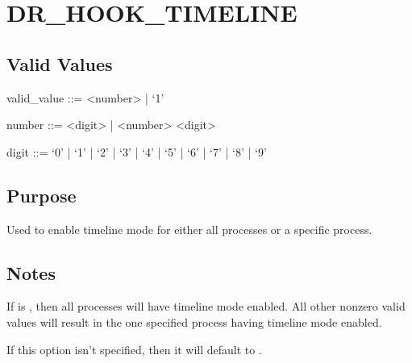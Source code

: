 \documentclass[letterpaper,10pt,english]{sphinxmanual}
\begin{document}
\section{DR\_HOOK\_TIMELINE}
\label{\detokenize{flag/flag:dr-hook-timeline}}\label{\detokenize{flag/flag:id90}}

\subsection{Valid Values}
\label{\detokenize{flag/flag:id91}}
\begin{DUlineblock}{0em}
\item[] valid\_value ::= \textless{}number\textgreater{} | ‘\sphinxhyphen{}1’
\item[] number ::= \textless{}digit\textgreater{} | \textless{}number\textgreater{} \textless{}digit\textgreater{}
\item[] digit ::= ‘0’ | ‘1’ | ‘2’ | ‘3’ | ‘4’ | ‘5’ | ‘6’ | ‘7’ | ‘8’ | ‘9’
\end{DUlineblock}


\subsection{Purpose}
\label{\detokenize{flag/flag:id92}}
\sphinxAtStartPar
Used to enable timeline mode for either all processes or a specific process.


\subsection{Notes}
\label{\detokenize{flag/flag:id93}}
\sphinxAtStartPar
If  is , then all processes will have timeline mode enabled. All other non\sphinxhyphen{}zero valid values will result in the one specified process having timeline mode enabled.

\sphinxAtStartPar
If this option isn’t specified, then it will default to .
\end{document}
